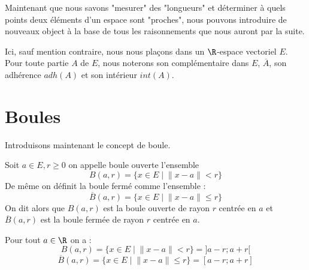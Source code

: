
\minitoc  %

Maintenant que nous savons "mesurer" des "longueurs" et déterminer à quels points deux éléments d'un espace sont 
"proches", nous pouvons introduire de nouveaux object à la base de tous les raisonnements que nous auront par la suite. 

\vspace{0.3cm}

Ici, sauf mention contraire, nous nous plaçons dans un $\R$-espace vectoriel $E$. 
Pour toute partie $A$ de $E$, nous noterons son complémentaire dans $E$, $\overline{A}$, 
son adhérence $adh(A)$ et son intérieur $int(A)$. 


\section{Boules}

Introduisons maintenant le concept de boule. 

\begin{definition}
    Soit $a \in E, r \geqslant 0$ on appelle {boule ouverte} l'ensemble 
        \[ B(a,r) = \{ x \in E \; | \; \| x - a\| <  r\} \] 
    De même on définit la boule fermé comme l'ensemble :
    \[ \overline{B}(a,r) = \{ x \in E \; | \; \| x - a\| \leqslant r\} \] 
    On dit alors que $B(a,r)$ est la boule ouverte de rayon $r$ centrée en $a$ et 
    $\overline{B}(a,r)$ est la boule fermée de rayon $r$ centrée en $a$. 
\end{definition}

\begin{example}
    Pour tout $a \in \R$ on a :
        \[B(a,r) = \{ x \in E \; | \; \| x - a\| <  r\} = ]a - r ; a + r [ \]
        \[\overline{B}(a,r) = \{ x \in E \; | \; \| x - a\| \leqslant  r\} = [a - r ; a + r ] \]
\end{example}

\newpage 


